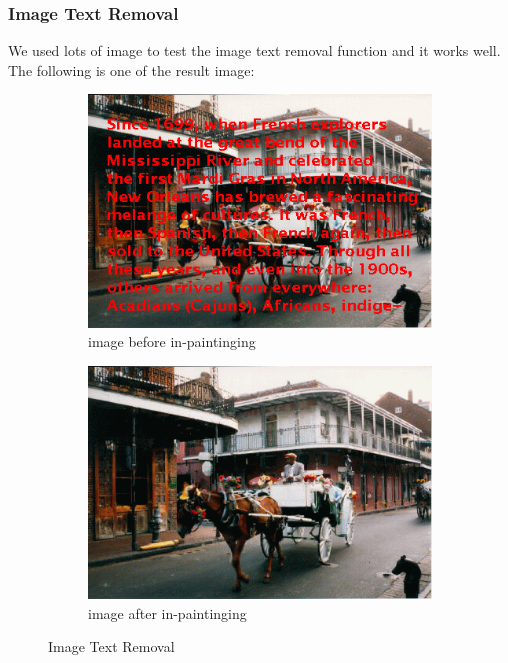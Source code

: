 \subsubsection*{Image Text Removal}
\qquad We used lots of image to test the image text removal function and it works well. The following is one of the result image:
\begin{figure}[H]
	\begin{subfigure}[pos]{.5\textwidth}
		\centering
		\includegraphics*[width=0.8\linewidth]{horse_car.png}
		\caption{image before in-paintinging}
	\end{subfigure}%
	\begin{subfigure}[pos]{.5\textwidth}
		\centering
		\includegraphics*[width=0.8\linewidth]{horse_car_result.png}
		\caption{image after in-paintinging}
	\end{subfigure}%
	\caption{Image Text Removal}
\end{figure}
